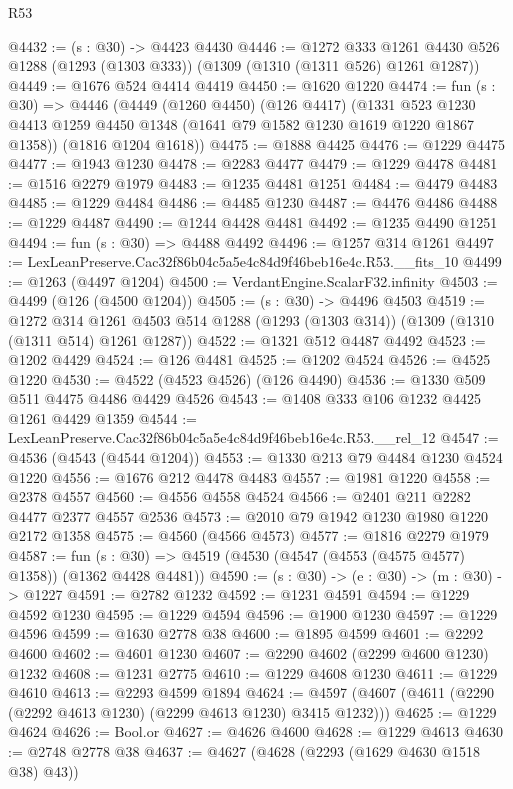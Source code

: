 \begin{lexlean}{R53}
\begin{coremodule}
@4432 := (s : @30) -> @4423 @4430
@4446 := @1272
    @333
    @1261
    @4430
    @526
    @1288
    (@1293 (@1303 @333))
    (@1309 (@1310 (@1311 @526) @1261 @1287))
@4449 := @1676 @524 @4414 @4419
@4450 := @1620 @1220
@4474 := fun (s : @30) =>
  @4446
    (@4449
      (@1260 @4450)
      (@126 @4417)
      (@1331 @523 @1230 @4413 @1259 @4450 @1348 (@1641 @79 @1582 @1230 @1619 @1220 @1867 @1358))
      (@1816 @1204 @1618))
@4475 := @1888 @4425
@4476 := @1229 @4475
@4477 := @1943 @1230
@4478 := @2283 @4477
@4479 := @1229 @4478
@4481 := @1516 @2279 @1979
@4483 := @1235 @4481 @1251
@4484 := @4479 @4483
@4485 := @1229 @4484
@4486 := @4485 @1230
@4487 := @4476 @4486
@4488 := @1229 @4487
@4490 := @1244 @4428 @4481
@4492 := @1235 @4490 @1251
@4494 := fun (s : @30) => @4488 @4492
@4496 := @1257 @314 @1261
@4497 := LexLeanPreserve.Cac32f86b04c5a5e4c84d9f46beb16e4c.R53.__fits_10
@4499 := @1263 (@4497 @1204)
@4500 := VerdantEngine.ScalarF32.infinity
@4503 := @4499 (@126 (@4500 @1204))
@4505 := (s : @30) -> @4496 @4503
@4519 := @1272
    @314
    @1261
    @4503
    @514
    @1288
    (@1293 (@1303 @314))
    (@1309 (@1310 (@1311 @514) @1261 @1287))
@4522 := @1321 @512 @4487 @4492
@4523 := @1202 @4429
@4524 := @126 @4481
@4525 := @1202 @4524
@4526 := @4525 @1220
@4530 := @4522 (@4523 @4526) (@126 @4490)
@4536 := @1330 @509 @511 @4475 @4486 @4429 @4526
@4543 := @1408 @333 @106 @1232 @4425 @1261 @4429 @1359
@4544 := LexLeanPreserve.Cac32f86b04c5a5e4c84d9f46beb16e4c.R53.__rel_12
@4547 := @4536 (@4543 (@4544 @1204))
@4553 := @1330 @213 @79 @4484 @1230 @4524 @1220
@4556 := @1676 @212 @4478 @4483
@4557 := @1981 @1220
@4558 := @2378 @4557
@4560 := @4556 @4558 @4524
@4566 := @2401 @211 @2282 @4477 @2377 @4557 @2536
@4573 := @2010 @79 @1942 @1230 @1980 @1220 @2172 @1358
@4575 := @4560 (@4566 @4573)
@4577 := @1816 @2279 @1979
@4587 := fun (s : @30) => @4519 (@4530 (@4547 (@4553 (@4575 @4577) @1358)) (@1362 @4428 @4481))
@4590 := (s : @30) -> (e : @30) -> (m : @30) -> @1227
@4591 := @2782 @1232
@4592 := @1231 @4591
@4594 := @1229 @4592 @1230
@4595 := @1229 @4594
@4596 := @1900 @1230
@4597 := @1229 @4596
@4599 := @1630 @2778 @38
@4600 := @1895 @4599
@4601 := @2292 @4600
@4602 := @4601 @1230
@4607 := @2290 @4602 (@2299 @4600 @1230) @1232
@4608 := @1231 @2775
@4610 := @1229 @4608 @1230
@4611 := @1229 @4610
@4613 := @2293 @4599 @1894
@4624 := @4597 (@4607 (@4611 (@2290 (@2292 @4613 @1230) (@2299 @4613 @1230) @3415 @1232)))
@4625 := @1229 @4624
@4626 := Bool.or
@4627 := @4626 @4600
@4628 := @1229 @4613
@4630 := @2748 @2778 @38
@4637 := @4627 (@4628 (@2293 (@1629 @4630 @1518 @38) @43))

\end{coremodule}
\end{lexlean}
